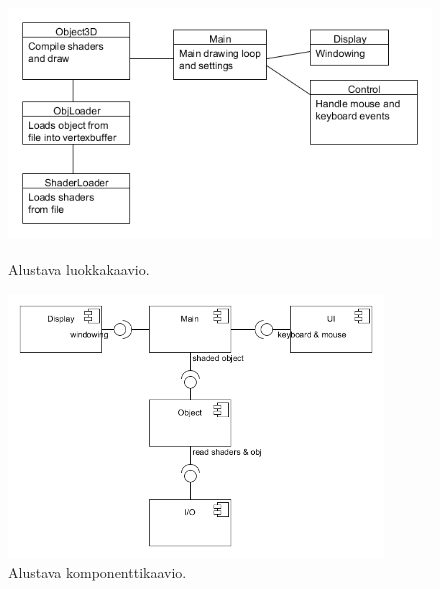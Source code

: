 \documentclass[utf8,bachelor]{gradu3}
\begin{document}
\begin{figure}[h] 
	\centering
	\includegraphics[height=7cm]{ClassDiagram.png}
	\caption{Alustava luokkakaavio.}
	\label{fig:ClassDiagram}
\end{figure}

\begin{figure}[h] 
	\centering
	\includegraphics[height=7cm]{ComponentDiagram.png}
	\caption{Alustava komponenttikaavio.}
	\label{fig:ComponentDiagram}
\end{figure}

\printbibliography 
\end{document}

